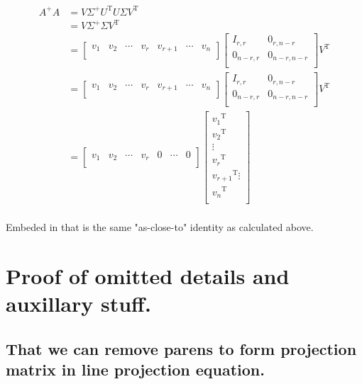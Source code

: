 \documentclass{article}      %
\DeclareMathOperator{\TextTranspose}{T}
\newcommand{\transpose}[1]{{{#1}^{\TextTranspose}}}
\begin{document}
\begin{align*}
A^{+} A 
&= V \Sigma^{+} \transpose{U} U \Sigma \transpose{V} \\
&= V \Sigma^{+} \Sigma \transpose{V} \\
&=
\begin{bmatrix}
v_1 & v_2 & \cdots & v_r & v_{r+1} & \cdots & v_n \\
\end{bmatrix}
\begin{bmatrix}
I_{r,r} & 0_{r,n-r} \\
0_{n-r,r} & 0_{n-r,n-r} \\
\end{bmatrix}
\transpose{V} \\
&=
\begin{bmatrix}
v_1 & v_2 & \cdots & v_r & v_{r+1} & \cdots & v_n \\
\end{bmatrix}
\begin{bmatrix}
I_{r,r} & 0_{r,n-r} \\
0_{n-r,r} & 0_{n-r,n-r} \\
\end{bmatrix}
\transpose{V} \\
&=
\begin{bmatrix}
v_1 & v_2 & \cdots & v_r & 0 & \cdots & 0 \\
\end{bmatrix}
\begin{bmatrix}
\transpose{v_1} \\ \transpose{v_2} \\ \vdots \\ \transpose{v_r} \\ \transpose{v_{r+1}} \vdots \\ \transpose{v_n} \\
\end{bmatrix}
\\
\end{align*}

Embeded in that is the same "as-close-to" identity as calculated above.

\section{ Proof of omitted details and auxillary stuff. }

\subsection{ That we can remove parens to form projection matrix in line projection equation. }
\end{document}
